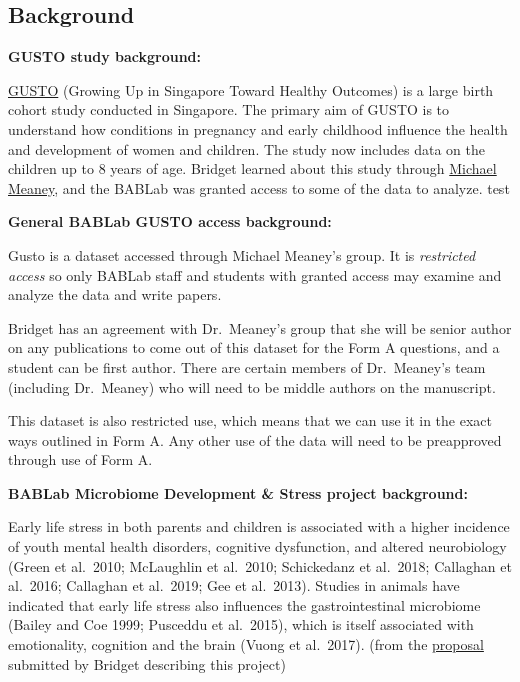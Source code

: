 \documentclass[
]{book}
\begin{document}
\hypertarget{background}{%
\subsection{Background}\label{background}}

\textbf{GUSTO study background:}

\href{http://www.gusto.sg/}{GUSTO} (Growing Up in Singapore Toward Healthy Outcomes) is a large birth cohort study conducted in Singapore. The primary aim of GUSTO is to understand how conditions in pregnancy and early childhood influence the health and development of women and children. The study now includes data on the children up to 8 years of age. Bridget learned about this study through \href{https://douglas.research.mcgill.ca/michael-meaney}{Michael Meaney}, and the BABLab was granted access to some of the data to analyze. test

\textbf{General BABLab GUSTO access background:}

Gusto is a dataset accessed through Michael Meaney's group. It is \emph{restricted access} so only BABLab staff and students with granted access may examine and analyze the data and write papers.

Bridget has an agreement with Dr.~Meaney's group that she will be senior author on any publications to come out of this dataset for the Form A questions, and a student can be first author. There are certain members of Dr.~Meaney's team (including Dr.~Meaney) who will need to be middle authors on the manuscript.

This dataset is also restricted use, which means that we can use it in the exact ways outlined in Form A. Any other use of the data will need to be preapproved through use of Form A.

\textbf{BABLab Microbiome Development \& Stress project background:}

Early life stress in both parents and children is associated with a higher incidence of youth mental health disorders, cognitive dysfunction, and altered neurobiology (Green et al.~2010; McLaughlin et al.~2010; Schickedanz et al.~2018; Callaghan et al.~2016; Callaghan et al.~2019; Gee et al.~2013). Studies in animals have indicated that early life stress also influences the gastrointestinal microbiome (Bailey and Coe 1999; Pusceddu et al.~2015), which is itself associated with emotionality, cognition and the brain (Vuong et al.~2017). (from the \href{https://ucla.app.box.com/file/740587024475}{proposal} submitted by Bridget describing this project)
\end{document}
